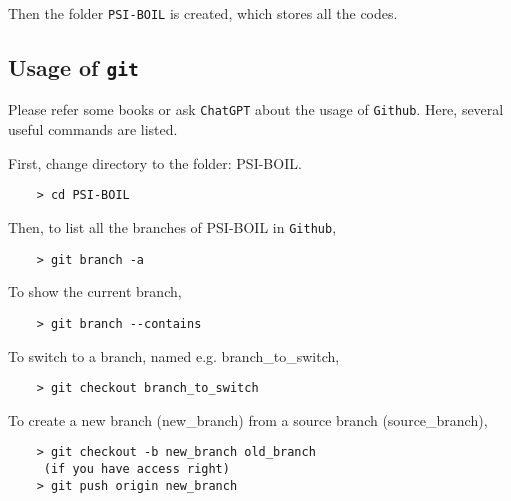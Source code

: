 Then the folder {\tt PSI-BOIL} is created, which stores all the codes. 

\subsection{Usage of {\tt git}}

Please refer some books or ask {\tt ChatGPT} about the usage of {\tt Github}.  Here, several useful commands are listed. 

First, change directory to the folder: PSI-BOIL.
\begin{verbatim}
	> cd PSI-BOIL
\end{verbatim}

Then, to list all the branches of PSI-BOIL in {\tt Github},
\begin{verbatim}
	> git branch -a
\end{verbatim}

To show the current branch,
\begin{verbatim}
	> git branch --contains
\end{verbatim}

To switch to a branch, named e.g. branch\_to\_switch,

\begin{verbatim}
	> git checkout branch_to_switch
\end{verbatim}


To create a new branch (new\_branch) from a source branch (source\_branch),
\begin{verbatim}
	> git checkout -b new_branch old_branch
	 (if you have access right)
	> git push origin new_branch 
\end{verbatim}


\vspace*{5mm}  %



